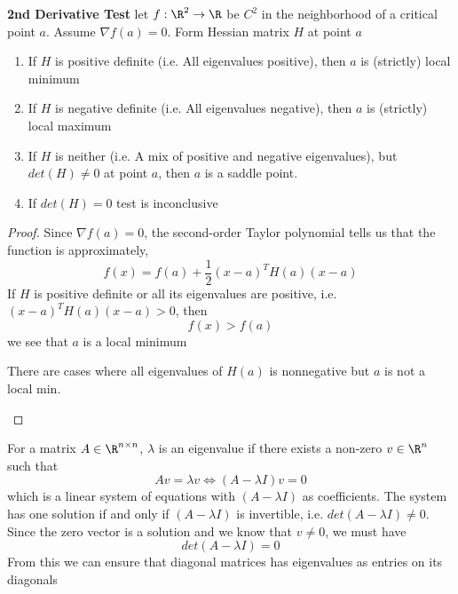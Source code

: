 \documentclass[11pt]{article}
\begin{document}
\begin{proposition*}
  \textbf{2nd Derivative Test}
  let $f: \R^2 \to \R$ be $C^2$ in the neighborhood of a critical point $a$. Assume $\nabla f(a) = 0$. Form Hessian matrix $H$ at point $a$
  \begin{enumerate}
    \item If $H$ is positive definite (i.e. All eigenvalues positive), then $a$ is (strictly) local minimum
    \item If $H$ is negative definite (i.e. All eigenvalues negative), then $a$ is (strictly) local maximum
    \item If $H$ is neither (i.e. A mix of positive and negative eigenvalues), but $det(H)  \neq 0$ at point $a$, then $a$ is a saddle point.
    \item If $det(H) = 0$ test is inconclusive
  \end{enumerate}
  \begin{proof}
    Since $\nabla f(a) = 0$, the second-order Taylor polynomial tells us that the function is approximately,
    \[
      f(x) = f(a) + \frac{1}{2}(x-a)^T H(a)(x-a)
    \]
    If $H$ is positive definite or all its eigenvalues are positive, i.e. $(x-a)^T H(a)(x-a) > 0$, then
    \[
      f(x) > f(a)
    \]
    we see that $a$ is a local minimum
    \begin{rem}
      There are cases where all eigenvalues of $H(a)$ is nonnegative but $a$ is not a local min.
    \end{rem}
  \end{proof}

\end{proposition*}


\begin{proposition*}
  For a matrix $A\in \R^{n\times n}$, $\lambda$ is an eigenvalue if there exists a non-zero $v\in\R^n$ such that
  \[
    Av = \lambda v \iff (A - \lambda I) v = 0
  \]
  which is a linear system of equations with $(A - \lambda I)$ as coefficients. The system has one solution if and only if $(A - \lambda I)$ is invertible, i.e. $det(A - \lambda I) \neq 0$. Since the zero vector is a solution and we know that $v\neq 0$, we must have
  \[
    det(A - \lambda I)  = 0
  \]
  From this we can ensure that diagonal matrices has eigenvalues as entries on its diagonals
\end{proposition*}
\end{document}
